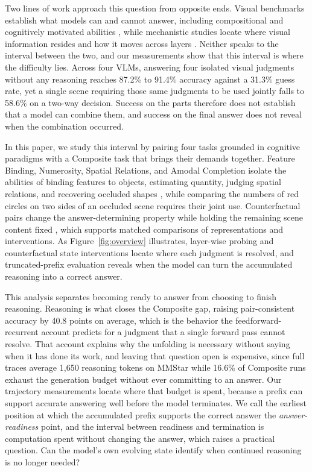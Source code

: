 \documentclass{article} %
\begin{document}
Two lines of work approach this question from opposite ends. Visual benchmarks establish what models can and cannot answer, including compositional and cognitively motivated abilities \citep{johnson2017clevr,huang2025visfactor}, while mechanistic studies locate where visual information resides and how it moves across layers \citep{neo2025interpreting,zhang2025crossmodal}. Neither speaks to the interval between the two, and our measurements show that this interval is where the difficulty lies. Across four VLMs, answering four isolated visual judgments without any reasoning reaches 87.2\% to 91.4\% accuracy against a 31.3\% guess rate, yet a single scene requiring those same judgments to be used jointly falls to 58.6\% on a two-way decision. Success on the parts therefore does not establish that a model can combine them, and success on the final answer does not reveal when the combination occurred.

In this paper, we study this interval by pairing four tasks grounded in cognitive paradigms with a Composite task that brings their demands together. Feature Binding, Numerosity, Spatial Relations, and Amodal Completion isolate the abilities of binding features to objects, estimating quantity, judging spatial relations, and recovering occluded shapes \citep{treisman1980feature,feigenson2004core,logan1994spatial,kellman1991theory}, while comparing the numbers of red circles on two sides of an occluded scene requires their joint use. Counterfactual pairs change the answer-determining property while holding the remaining scene content fixed \citep{gardner2020evaluating,bitton2021automatic}, which supports matched comparisons of representations and interventions. As Figure~\ref{fig:overview} illustrates, layer-wise probing and counterfactual state interventions locate where each judgment is resolved, and truncated-prefix evaluation reveals when the model can turn the accumulated reasoning into a correct answer.

This analysis separates becoming ready to answer from choosing to finish reasoning. Reasoning is what closes the Composite gap, raising pair-consistent accuracy by 40.8 points on average, which is the behavior the feedforward-recurrent account predicts for a judgment that a single forward pass cannot resolve. That account explains why the unfolding is necessary without saying when it has done its work, and leaving that question open is expensive, since full traces average 1,650 reasoning tokens on MMStar while 16.6\% of Composite runs exhaust the generation budget without ever committing to an answer. Our trajectory measurements locate where that budget is spent, because a prefix can support accurate answering well before the model terminates. We call the earliest position at which the accumulated prefix supports the correct answer the \emph{answer-readiness} point, and the interval between readiness and termination is computation spent without changing the answer, which raises a practical question. Can the model's own evolving state identify when continued reasoning is no longer needed?
\end{document}
